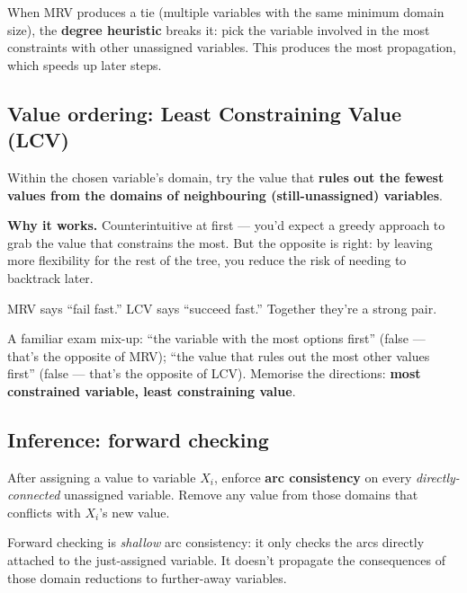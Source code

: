 \documentclass[11pt, a4paper]{article}
\begin{document}
When MRV produces a tie (multiple variables with the same minimum domain size), the \textbf{degree heuristic} breaks it: pick the variable involved in the most constraints with other unassigned variables. This produces the most propagation, which speeds up later steps.

\subsection{Value ordering: Least Constraining Value (LCV)}

\begin{defbox}
Within the chosen variable's domain, try the value that \textbf{rules out the fewest values from the domains of neighbouring (still-unassigned) variables}.
\end{defbox}

\textbf{Why it works.} Counterintuitive at first — you'd expect a greedy approach to grab the value that constrains the most. But the opposite is right: by leaving more flexibility for the rest of the tree, you reduce the risk of needing to backtrack later.

MRV says ``fail fast.'' LCV says ``succeed fast.'' Together they're a strong pair.

\begin{trapbox}
A familiar exam mix-up: ``the variable with the most options first'' (false — that's the opposite of MRV); ``the value that rules out the most other values first'' (false — that's the opposite of LCV). Memorise the directions: \textbf{most constrained variable, least constraining value}.
\end{trapbox}

\subsection{Inference: forward checking}

\begin{defbox}
After assigning a value to variable $X_i$, enforce \textbf{arc consistency} on every \emph{directly-connected} unassigned variable. Remove any value from those domains that conflicts with $X_i$'s new value.
\end{defbox}

Forward checking is \emph{shallow} arc consistency: it only checks the arcs directly attached to the just-assigned variable. It doesn't propagate the consequences of those domain reductions to further-away variables.
\end{document}
